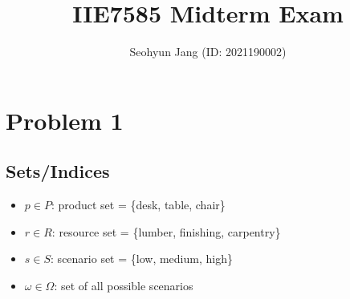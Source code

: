\documentclass[8pt]{article}
\title{IIE7585 Midterm Exam}
\author{Seohyun Jang (ID: 2021190002)}
\begin{document}
\maketitle

\section*{Problem 1}

\subsection*{Sets/Indices}
\begin{itemize}
    \item $p \in P$: product set = \{desk, table, chair\}
    \item $r \in R$: resource set = \{lumber, finishing, carpentry\}
    \item $s \in S$: scenario set = \{low, medium, high\}
    \item $\omega \in \Omega$: set of all possible scenarios
\end{itemize}
\end{document}
